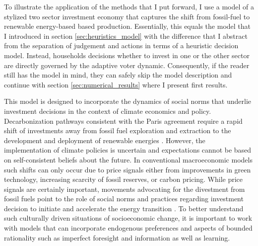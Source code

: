 To illustrate the application of the methods that I put forward, I use a model of a stylized two sector investment economy that captures the shift from fossil-fuel to renewable energy-based based production. Essentially, this equals the model that I introduced in section \ref{sec:heuristics_model} with the difference that I abstract from the separation of judgement and actions in terms of a heuristic decision model. Instead, households decisions whether to invest in one or the other sector are directly governed by the adaptive voter dynamic.
Consequently, if the reader still has the model in mind, they can safely skip the model description and continue with section \ref{sec:numerical_results} where I present first results.

This model is designed to incorporate the dynamics of social norms that underlie investment decisions in the context of climate economics and policy. Decarbonization pathways consistent with the Paris agreement require a rapid shift of investments away from fossil fuel exploration and extraction to the development and deployment of renewable energies \citep{IPCC2014}. However, the implementation of climate policies is uncertain and expectations cannot be based on self-consistent beliefs about the future.  In conventional macroeconomic models such shifts can only occur due to price signals either from improvements in green technology, increasing scarcity of fossil reserves, or carbon pricing. While price signals are certainly important, movements advocating for the divestment from fossil fuels point to the role of social norms and practices regarding investment decision to initiate and accelerate the energy transition \citep{Ans2013}. To better understand such culturally driven situations of socioeconomic change, it is important to work with models that can incorporate endogenous preferences and aspects of bounded rationality such as imperfect foresight and information as well as learning.
\label{sec:approx_economy}


